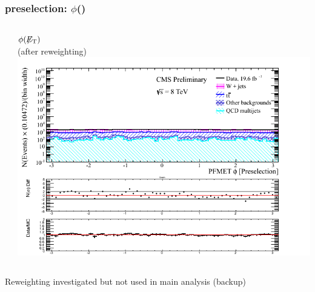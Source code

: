 \documentclass[bigger]{beamer}
\providecommand{\alert}[1]{\textbf{#1}}
\begin{document}
\begin{frame}
\frametitle{\enujj preselection: $\phi$(\met)}
\label{sec-3-1-3}
\begin{columns} %
\label{sec-3-1-3-1}
\begin{column}{0.6\textwidth}
\label{sec-3-1-3-1-2}

\centering
$\phi(\not\!\!{E_{\text{T}}})$ \\ (after reweighting)
\includegraphics[width=\textwidth]{fig/enu/reweight/METPhi_PAS_enujjMETandMTReweighted.png}
\end{column}
\end{columns}
\label{sec-3-1-3-2}

\small
\centering
Reweighting investigated but not used in main analysis (backup)
\normalsize
\end{frame}
\end{document}
